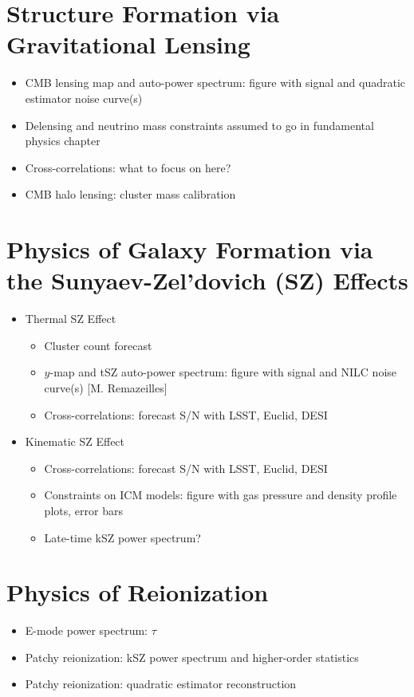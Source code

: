 \documentclass[PICOReport.tex]{subfiles}
\begin{document}

\section{Structure Formation via Gravitational Lensing}
\begin{itemize}
\item CMB lensing map and auto-power spectrum: figure with signal and quadratic estimator noise curve(s)
\item Delensing and neutrino mass constraints assumed to go in fundamental physics chapter
\item Cross-correlations: what to focus on here?
\item CMB halo lensing: cluster mass calibration
\end{itemize}

\section{Physics of Galaxy Formation via the Sunyaev-Zel'dovich (SZ) Effects}
\begin{itemize}
\item Thermal SZ Effect
\begin{itemize}
\item Cluster count forecast
\item $y$-map and tSZ auto-power spectrum: figure with signal and NILC noise curve(s) [M. Remazeilles]
\item Cross-correlations: forecast S/N with LSST, Euclid, DESI
\end{itemize}
\item Kinematic SZ Effect
\begin{itemize}
\item Cross-correlations: forecast S/N with LSST, Euclid, DESI
\item Constraints on ICM models: figure with gas pressure and density profile plots, error bars
\item Late-time kSZ power spectrum?
\end{itemize}
\end{itemize}

\section{Physics of Reionization}
\begin{itemize}
\item E-mode power spectrum: $\tau$
\item Patchy reionization: kSZ power spectrum and higher-order statistics
\item Patchy reionization: quadratic estimator reconstruction
\end{itemize}
\end{document}
